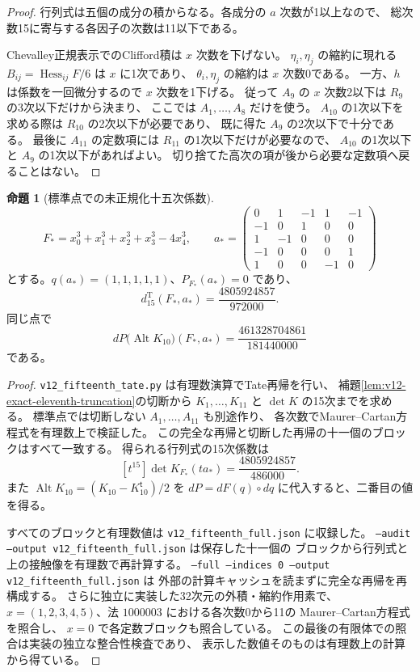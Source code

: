 \documentclass[a4paper,11pt]{ltjsarticle}
\theoremstyle{definition}
\newtheorem{proposition}[theorem]{命題}
\begin{document}
\begin{proof}
行列式は五個の成分の積からなる。各成分の $a$ 次数が1以上なので、
総次数15に寄与する各因子の次数は11以下である。

Chevalley正規表示でのClifford積は $x$ 次数を下げない。
$\eta_i,\eta_j$ の縮約に現れる
$B_{ij}=\operatorname{Hess}_{ij}F/6$ は $x$ に1次であり、
$\theta_i,\eta_j$ の縮約は $x$ 次数0である。
一方、$h$ は係数を一回微分するので $x$ 次数を1下げる。
従って $A_9$ の $x$ 次数2以下は $R_9$ の3次以下だけから決まり、
ここでは $A_1,\ldots,A_8$ だけを使う。
$A_{10}$ の1次以下を求める際は $R_{10}$ の2次以下が必要であり、
既に得た $A_9$ の2次以下で十分である。
最後に $A_{11}$ の定数項には $R_{11}$ の1次以下だけが必要なので、
$A_{10}$ の1次以下と $A_9$ の1次以下があればよい。
切り捨てた高次の項が後から必要な定数項へ戻ることはない。
\end{proof}

\begin{proposition}[標準点での未正規化十五次係数]
\label{prop:v12-actual-fifteenth-value}
\[
 F_*=x_0^3+x_1^3+x_2^3+x_3^3-4x_4^3,\qquad
 a_*=
 \begin{pmatrix}
 0&1&-1&1&-1\\
 -1&0&1&0&0\\
 1&-1&0&0&0\\
 -1&0&0&0&1\\
 1&0&0&-1&0
 \end{pmatrix}
\]
とする。$q(a_*)=(1,1,1,1,1)$、$P_{F_*}(a_*)=0$ であり、
\[
 \boxed{\displaystyle
 d^{\mathrm T}_{15}(F_*,a_*)=
 \frac{4805924857}{972000}.}
\]
同じ点で
\[
 dP\bigl(\operatorname{Alt}K_{10}\bigr)(F_*,a_*)
 =\frac{461328704861}{181440000}
\]
である。
\end{proposition}

\begin{proof}
\texttt{v12\_fifteenth\_tate.py} は有理数演算でTate再帰を行い、
補題\ref{lem:v12-exact-eleventh-truncation}の切断から
$K_1,\ldots,K_{11}$ と $\det K$ の15次までを求める。
標準点では切断しない $A_1,\ldots,A_{11}$ も別途作り、
各次数でMaurer--Cartan方程式を有理数上で検証した。
この完全な再帰と切断した再帰の十一個のブロックはすべて一致する。
得られる行列式の15次係数は
\[
 [t^{15}]\det K_{F_*}(ta_*)=\frac{4805924857}{486000}.
\]
また $\operatorname{Alt}K_{10}=(K_{10}-K_{10}^{\mathsf t})/2$ を
$dP=dF(q)\circ dq$ に代入すると、二番目の値を得る。

すべてのブロックと有理数値は
\texttt{v12\_fifteenth\_full.json} に収録した。
\texttt{--audit --output v12\_fifteenth\_full.json} は保存した十一個の
ブロックから行列式と上の接触像を有理数で再計算する。
\texttt{--full --indices 0 --output v12\_fifteenth\_full.json} は
外部の計算キャッシュを読まずに完全な再帰を再構成する。
さらに独立に実装した32次元の外積・縮約作用素で、
$x=(1,2,3,4,5)$、法 $1000003$ における各次数0から11の
Maurer--Cartan方程式を照合し、
$x=0$ で各定数ブロックも照合している。
この最後の有限体での照合は実装の独立な整合性検査であり、
表示した数値そのものは有理数上の計算から得ている。
\end{proof}
\end{document}
